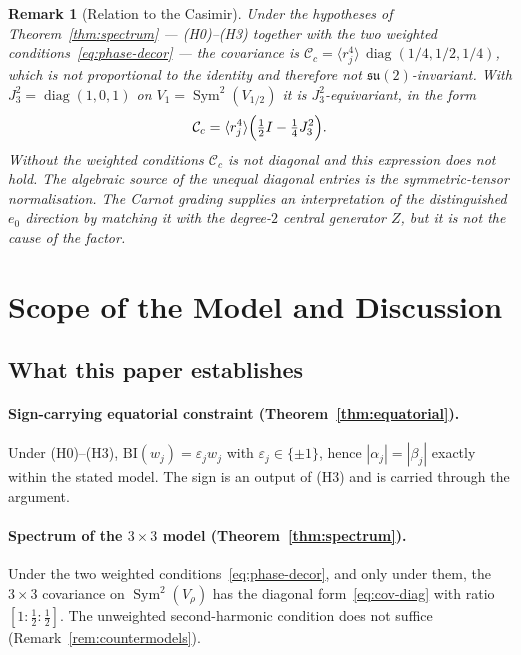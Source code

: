 \documentclass[11pt,a4paper]{article}
\newtheorem{remark}[theorem]{Remark}
\DeclareMathOperator{\Sym}{Sym}
\newcommand{\Cc}{\mathcal{C}_c}
\newcommand{\BI}{\mathrm{BI}}
\begin{document}
  \begin{remark}[Relation to the Casimir]
    \label{rem:casimir}
    Under the hypotheses of Theorem~\ref{thm:spectrum} --- (H0)--(H3) together with the two weighted
    conditions~\eqref{eq:phase-decor} --- the covariance is
    $\Cc = \langle r_j^4\rangle\,\operatorname{diag}(1/4, 1/2, 1/4)$, which is not proportional to
    the identity and therefore not $\mathfrak{su}(2)$-invariant.
    With $J_3^2 = \operatorname{diag}(1, 0, 1)$ on $V_1 = \Sym^2(V_{1/2})$ it is
    $J_3^2$-equivariant, in the form
    \[
      \Cc = \langle r_j^4\rangle\Bigl(\tfrac{1}{2} I - \tfrac{1}{4} J_3^2\Bigr) .
    \]
    Without the weighted conditions $\Cc$ is not diagonal and this expression does not hold.
    The algebraic source of the unequal diagonal entries is the symmetric-tensor normalisation.
    The Carnot grading supplies an interpretation of the distinguished $e_0$ direction by matching
    it with the degree-$2$ central generator $Z$, but it is not the cause of the factor.
  \end{remark}

  \section{Scope of the Model and Discussion}
  \label{sec:discussion}

  \subsection{What this paper establishes}
    \label{sec:establishes}

    \paragraph{Sign-carrying equatorial constraint (Theorem~\ref{thm:equatorial}).}
      Under (H0)--(H3), $\BI(w_j) = \varepsilon_j w_j$ with $\varepsilon_j \in \{\pm 1\}$, hence
      $|\alpha_j| = |\beta_j|$ exactly within the stated model.
      The sign is an output of (H3) and is carried through the argument.

    \paragraph{Spectrum of the $3\times3$ model (Theorem~\ref{thm:spectrum}).}
      Under the two weighted conditions~\eqref{eq:phase-decor}, and only under them, the
      $3\times3$ covariance on $\Sym^2(V_\rho)$ has the diagonal form~\eqref{eq:cov-diag} with
      ratio $[1:\tfrac{1}{2}:\tfrac{1}{2}]$.
      The unweighted second-harmonic condition does not suffice
      (Remark~\ref{rem:countermodels}).
\end{document}
